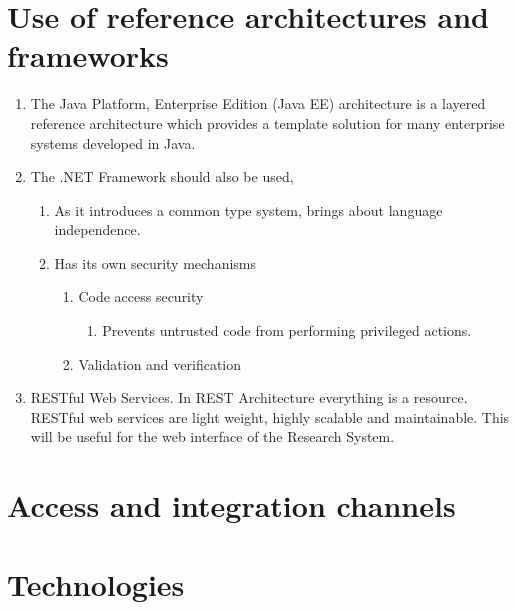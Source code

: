 \documentclass[hidelinks,a4paper,12pt]{article}
\begin{document}
		\section{Use of reference architectures and frameworks}
			\begin{enumerate}
				\item  The Java Platform, Enterprise Edition (Java EE) architecture is a layered reference architecture which provides a template solution for many enterprise systems developed in Java.
				\item  The .NET Framework should also be used, 
				\begin{enumerate}
					\item  As it introduces a common type system, brings about language independence.
					\item  Has its own security mechanisms
					\begin{enumerate}
						\item  Code access security
						\begin{enumerate}
							\item  Prevents untrusted code from performing privileged actions.
						\end{enumerate}
						\item  Validation and verification
					\end{enumerate}
				\end{enumerate}
				\item  RESTful Web Services. In REST Architecture everything is a resource. RESTful web services are light weight, highly scalable and maintainable. This will be useful for the web interface of the Research System.
			\end{enumerate}
		
		
		
		\section{Access and integration channels}
		\section{Technologies}
		 

 



 
\end{document}
